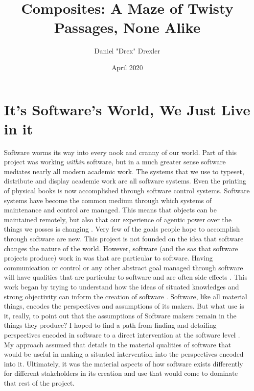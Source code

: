 \documentclass[a4paper,man,natbib]{apa6}
\title{Composites: A Maze of Twisty Passages, None Alike}
\author{Daniel "Drex" Drexler}
\affiliation{Center for Science, Technology and Society at Drexel University}
\date{April 2020}
\begin{document}
   \maketitle
   \section*{It's Software's World, We Just Live in it}
   Software worms its way into every nook and cranny of our world. Part of this project was working \textit{within} software, but in a much greater sense software mediates nearly all modern academic work. The systems that we use to typeset, distribute and display academic work are all software systems. Even the printing of physical books is now accomplished through software control systems. Software systems have become the common medium through which systems of maintenance and control are managed. This means that objects can be maintained remotely, but also that our experience of agentic power over the things we posses is changing \citep{Koebler2017-dt}. Very few of the goals people hope to accomplish through software are new. This project is not founded on the idea that software changes the nature of the world. However, software (and the \glspl{sa} that software projects produce) work in was that are particular to software. Having communication or control or any other abstract goal managed through software will have qualities that are particular to software and are often side effects \citep{Mackenzie2006-hb, Kitchin2011-af}. This work began by trying to understand how the ideas of situated knowledges and strong objectivity can inform the creation of software \citep{Harding1992-od,Haraway1988-nh}. Software, like all material things, encodes the perspectives and assumptions of its makers. But what use is it, really, to point out that the assumptions of Software makers remain in the things they produce? I hoped to find a path from finding and detailing perspectives encoded in software to a direct intervention at the software level \citep{Zuiderent-Jerak2015-go}. My approach assumed that details in the material qualities of software that would be useful in making a situated intervention into the perspectives encoded into it. Ultimately, it was the material aspects of how software exists differently for different stakeholders in its creation and use that would come to dominate that rest of the project.
\end{document}
